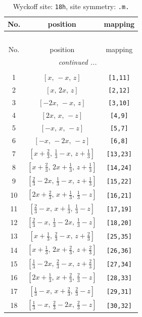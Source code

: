 \documentclass[fleqn,8pt]{jsarticle}
\begin{document}
\renewcommand{\arraystretch}{1.2}
\begin{longtable}{ccc}
\caption{Wyckoff site: {\tt 18h}, site symmetry: {\tt .m.}}
 \\
 \hline \hline
No. & position & mapping \\ \hline \endfirsthead

\multicolumn{2}{l}{\tablename\ \thetable{}} \\
 \hline \hline
No. & position & mapping \\ \hline \endhead

 \hline \hline
\multicolumn{2}{r}{\footnotesize\it continued ...} \\ \endfoot

 \hline \hline
\multicolumn{2}{r}{} \\ \endlastfoot

1 & $\left[ x,\, - x,\, z \right]$ & {\tt [1,11]} \\ \hline
2 & $\left[ x,\, 2 x,\, z \right]$ & {\tt [2,12]} \\ \hline
3 & $\left[ - 2 x,\, - x,\, z \right]$ & {\tt [3,10]} \\ \hline
4 & $\left[ 2 x,\, x,\, - z \right]$ & {\tt [4,9]} \\ \hline
5 & $\left[ - x,\, x,\, - z \right]$ & {\tt [5,7]} \\ \hline
6 & $\left[ - x,\, - 2 x,\, - z \right]$ & {\tt [6,8]} \\ \hline
7 & $\left[ x + \frac{2}{3},\, \frac{1}{3} - x,\, z + \frac{1}{3} \right]$ & {\tt [13,23]} \\ \hline
8 & $\left[ x + \frac{2}{3},\, 2 x + \frac{1}{3},\, z + \frac{1}{3} \right]$ & {\tt [14,24]} \\ \hline
9 & $\left[ \frac{2}{3} - 2 x,\, \frac{1}{3} - x,\, z + \frac{1}{3} \right]$ & {\tt [15,22]} \\ \hline
10 & $\left[ 2 x + \frac{2}{3},\, x + \frac{1}{3},\, \frac{1}{3} - z \right]$ & {\tt [16,21]} \\ \hline
11 & $\left[ \frac{2}{3} - x,\, x + \frac{1}{3},\, \frac{1}{3} - z \right]$ & {\tt [17,19]} \\ \hline
12 & $\left[ \frac{2}{3} - x,\, \frac{1}{3} - 2 x,\, \frac{1}{3} - z \right]$ & {\tt [18,20]} \\ \hline
13 & $\left[ x + \frac{1}{3},\, \frac{2}{3} - x,\, z + \frac{2}{3} \right]$ & {\tt [25,35]} \\ \hline
14 & $\left[ x + \frac{1}{3},\, 2 x + \frac{2}{3},\, z + \frac{2}{3} \right]$ & {\tt [26,36]} \\ \hline
15 & $\left[ \frac{1}{3} - 2 x,\, \frac{2}{3} - x,\, z + \frac{2}{3} \right]$ & {\tt [27,34]} \\ \hline
16 & $\left[ 2 x + \frac{1}{3},\, x + \frac{2}{3},\, \frac{2}{3} - z \right]$ & {\tt [28,33]} \\ \hline
17 & $\left[ \frac{1}{3} - x,\, x + \frac{2}{3},\, \frac{2}{3} - z \right]$ & {\tt [29,31]} \\ \hline
18 & $\left[ \frac{1}{3} - x,\, \frac{2}{3} - 2 x,\, \frac{2}{3} - z \right]$ & {\tt [30,32]} \\
\end{longtable}
\end{document}
